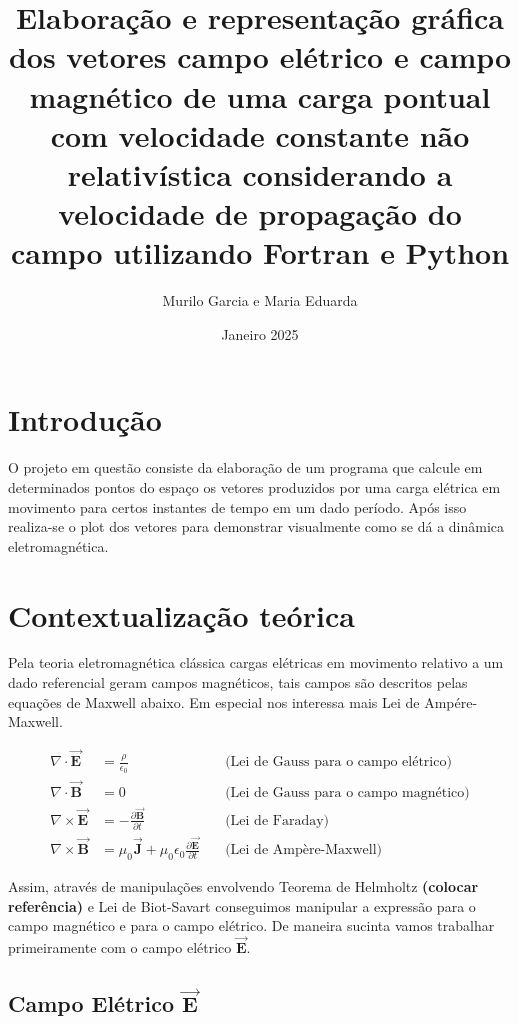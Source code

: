 \documentclass{article}
\title{Elaboração e representação gráfica dos vetores campo elétrico e campo magnético de uma carga pontual com velocidade constante não relativística considerando a velocidade de propagação do campo utilizando Fortran e Python }
\author{Murilo Garcia e Maria Eduarda}
\date{Janeiro 2025}
\begin{document}
\maketitle
\newpage
\section{Introdução}
\hspace{0.45cm}O projeto em questão consiste da elaboração de um programa que calcule em determinados pontos do espaço os vetores produzidos por uma carga elétrica em movimento para certos instantes de tempo em um dado período. Após isso realiza-se o plot dos vetores para demonstrar visualmente como se dá a dinâmica eletromagnética.

\section{Contextualização teórica}
\hspace{0.45cm}Pela teoria eletromagnética clássica cargas elétricas em movimento relativo a um dado referencial geram campos magnéticos, tais campos são descritos  pelas equações de Maxwell abaixo. Em especial nos interessa mais Lei de Ampére-Maxwell.


\begin{align}
    \nabla \cdot \vec{\mathbf{E}} &= \frac{\rho}{\epsilon_0} \quad &\text{(Lei de Gauss para o campo elétrico)} \\
    \nabla \cdot \vec{\mathbf{B}} &= 0 \quad &\text{(Lei de Gauss para o campo magnético)} \\
    \nabla \times \vec{\mathbf{E}} &= -\frac{\partial \vec{\mathbf{B}}}{\partial t} \quad &\text{(Lei de Faraday)} \\
    \nabla \times \vec{\mathbf{B}} &= \mu_0 \vec{\mathbf{J}} + \mu_0 \epsilon_0 \frac{\partial \vec{\mathbf{E}}}{\partial t} \quad &\text{(Lei de Ampère-Maxwell)}
\end{align}

\vspace{0.3cm}


Assim, através de manipulações envolvendo Teorema de Helmholtz \textbf{(colocar referência)} e Lei de Biot-Savart conseguimos manipular a expressão para o campo magnético e para o campo elétrico. De maneira sucinta vamos trabalhar primeiramente com o campo elétrico $\vec{\mathbf{E}}$.

\subsection{Campo Elétrico $\vec{\mathbf{E}}$}
\end{document}
